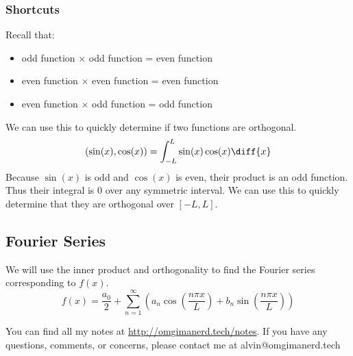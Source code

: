 \documentclass{math}
\begin{document}
\subsubsection*{Shortcuts}
Recall that:
\begin{itemize}
  \item odd function \( \times \) odd function = even function
  \item even function \( \times \) even function = even function
  \item even function \( \times \) odd function = odd function
\end{itemize}
We can use this to quickly determine if two functions are orthogonal.
\[ (\sin(x),\cos(x)) = \int_{-L}^{L}\sin(x)\cos(x)\diff{x} \]
Because \( \sin(x) \) is odd and \( \cos(x) \) is even, their product is an odd
function. Thus their integral is 0 over any symmetric interval. We can use this
to quickly determine that they are orthogonal over \( [-L,L] \).

\subsection*{Fourier Series}
We will use the inner product and orthogonality to find the Fourier series
corresponding to \( f(x) \).
\[ f(x) = \frac{a_0}{2}+\sum_{n=1}^{\infty}(a_n\cos(\frac{n\pi x}{L})+
  b_n\sin(\frac{n\pi x}{L})) \]

\begin{center}
  You can find all my notes at \url{http://omgimanerd.tech/notes}. If you have
  any questions, comments, or concerns, please contact me at
  alvin@omgimanerd.tech
\end{center}
\end{document}
